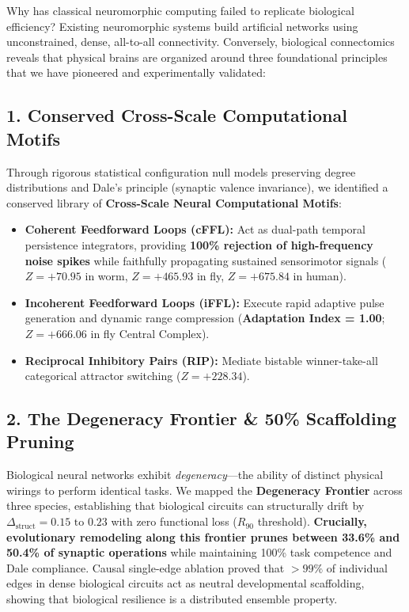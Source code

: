 \documentclass[11pt,letterpaper]{article}
\begin{document}
Why has classical neuromorphic computing failed to replicate biological efficiency? Existing neuromorphic systems build artificial networks using unconstrained, dense, all-to-all connectivity. Conversely, biological connectomics reveals that physical brains are organized around three foundational principles that we have pioneered and experimentally validated:

\subsection{1. Conserved Cross-Scale Computational Motifs}
Through rigorous statistical configuration null models preserving degree distributions and Dale's principle (synaptic valence invariance), we identified a conserved library of \textbf{Cross-Scale Neural Computational Motifs}:
\begin{itemize}[leftmargin=*]
    \item \textbf{Coherent Feedforward Loops (cFFL):} Act as dual-path temporal persistence integrators, providing \textbf{100\% rejection of high-frequency noise spikes} while faithfully propagating sustained sensorimotor signals ($Z = +70.95$ in worm, $Z = +465.93$ in fly, $Z = +675.84$ in human).
    \item \textbf{Incoherent Feedforward Loops (iFFL):} Execute rapid adaptive pulse generation and dynamic range compression (\textbf{Adaptation Index = 1.00}; $Z = +666.06$ in fly Central Complex).
    \item \textbf{Reciprocal Inhibitory Pairs (RIP):} Mediate bistable winner-take-all categorical attractor switching ($Z = +228.34$).
\end{itemize}

\subsection{2. The Degeneracy Frontier \& 50\% Scaffolding Pruning}
Biological neural networks exhibit \textit{degeneracy}---the ability of distinct physical wirings to perform identical tasks. We mapped the \textbf{Degeneracy Frontier} across three species, establishing that biological circuits can structurally drift by $\Delta_{\mathrm{struct}} = 0.15\text{ to }0.23$ with zero functional loss ($R_{90}$ threshold). 
\textbf{Crucially, evolutionary remodeling along this frontier prunes between 33.6\% and 50.4\% of synaptic operations} while maintaining 100\% task competence and Dale compliance. Causal single-edge ablation proved that $>99\%$ of individual edges in dense biological circuits act as neutral developmental scaffolding, showing that biological resilience is a distributed ensemble property.
\end{document}
